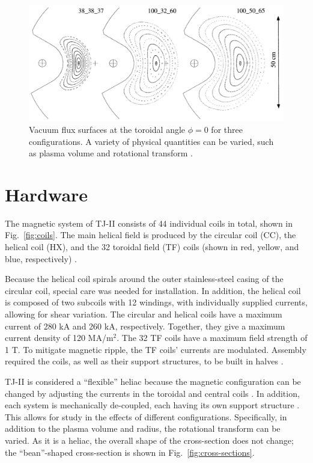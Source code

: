 \documentclass[a4paper, 12pt]{article}
\begin{document}
\begin{figure}
\centering
	\includegraphics[width=\linewidth]{../Graphics/3_configs.png}
	\caption{Vacuum flux surfaces at the toroidal angle $\phi = 0$ for three configurations. A variety of physical quantities can be varied, such as plasma volume and rotational transform \cite{alejaldre_first_1999}.}
	\label{fig:3_configs}
\end{figure}


\section*{Hardware}
The magnetic system of TJ-II consists of 44 individual coils in total, shown in Fig.~\ref{fig:coils}. The main helical field is produced by the circular coil (CC), the helical coil (HX), and the 32 toroidal field (TF) coils (shown in red, yellow, and blue, respectively) \cite{tj-ii_nodate}.

Because the helical coil spirals around the outer stainless-steel casing of the circular coil, special care was needed for installation. In addition, the helical coil is composed of two subcoils with 12 windings, with individually supplied currents, allowing for shear variation. The circular and helical coils have a maximum current of 280 kA and 260 kA, respectively. Together, they give a maximum current density of 120 MA/m$^2$. The 32 TF coils have a maximum field strength of 1 T. To mitigate magnetic ripple, the TF coils' currents are modulated. Assembly required the coils, as well as their support structures, to be built in halves \cite{ascasibar_overview_2001}.

TJ-II is considered a ``flexible'' heliac because the magnetic configuration can be changed by adjusting the currents in the toroidal and central coils \cite{solano_study_1988}. In addition, each system is mechanically de-coupled, each having its own support structure \cite{ascasibar_overview_2001}. This allows for study in the effects of different configurations. Specifically, in addition to the plasma volume and radius, the rotational transform can be varied. As it is a heliac, the overall shape of the cross-section does not change; the ``bean''-shaped cross-section is shown in Fig.~\ref{fig:cross-sections}.
\end{document}
